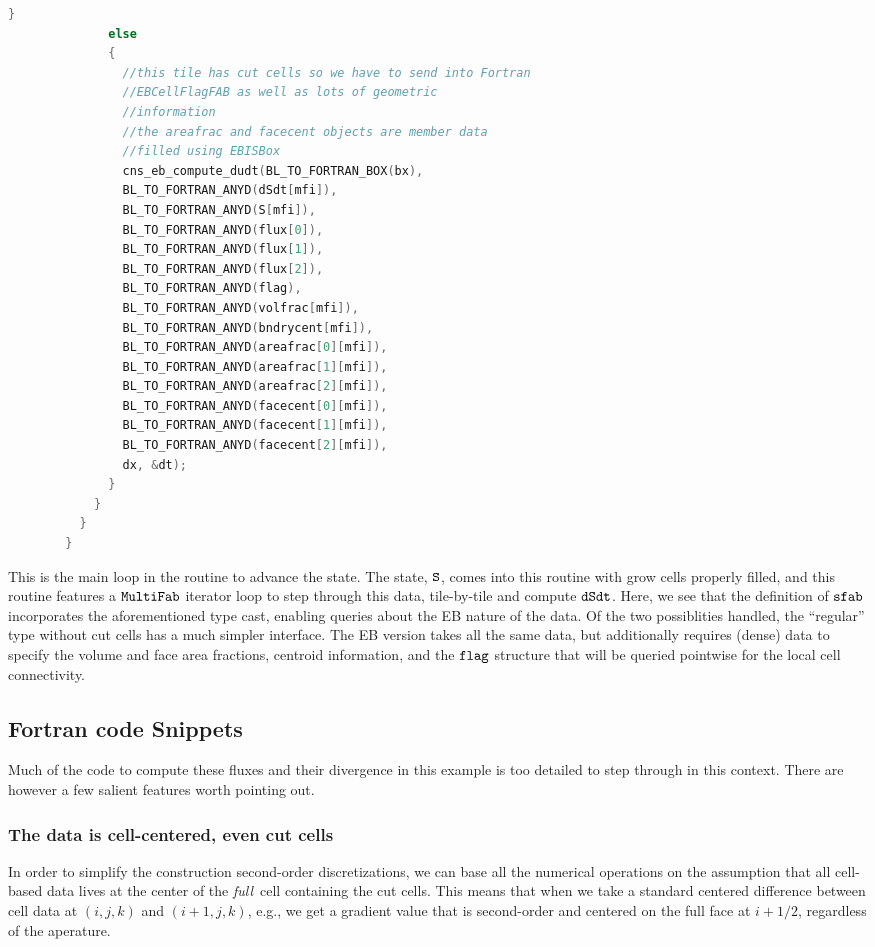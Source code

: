 \begin{lstlisting}[language=cpp]
              }
              else
              {
                //this tile has cut cells so we have to send into Fortran
                //EBCellFlagFAB as well as lots of geometric
                //information
                //the areafrac and facecent objects are member data
                //filled using EBISBox
                cns_eb_compute_dudt(BL_TO_FORTRAN_BOX(bx),
                BL_TO_FORTRAN_ANYD(dSdt[mfi]),
                BL_TO_FORTRAN_ANYD(S[mfi]),
                BL_TO_FORTRAN_ANYD(flux[0]),
                BL_TO_FORTRAN_ANYD(flux[1]),
                BL_TO_FORTRAN_ANYD(flux[2]),
                BL_TO_FORTRAN_ANYD(flag),
                BL_TO_FORTRAN_ANYD(volfrac[mfi]),
                BL_TO_FORTRAN_ANYD(bndrycent[mfi]),
                BL_TO_FORTRAN_ANYD(areafrac[0][mfi]),
                BL_TO_FORTRAN_ANYD(areafrac[1][mfi]),
                BL_TO_FORTRAN_ANYD(areafrac[2][mfi]),
                BL_TO_FORTRAN_ANYD(facecent[0][mfi]),
                BL_TO_FORTRAN_ANYD(facecent[1][mfi]),
                BL_TO_FORTRAN_ANYD(facecent[2][mfi]),
                dx, &dt);
              }
            }
          }
        }

\end{lstlisting}

This is the main loop in the routine to advance the state.  The state, $\tt{S}$, comes into this routine with grow cells
properly filled, and this routine features a $\tt{MultiFab}$ iterator loop to step through this data, tile-by-tile and compute
$\tt{dSdt}$.  Here, we see that the definition of $\tt{sfab}$ incorporates the aforementioned type cast, enabling queries about
the EB nature of the data.  Of the two possiblities handled, the ``regular'' type without cut cells has a much simpler interface.
The EB version takes all the same data, but additionally requires (dense) data to specify the volume and face area fractions,
centroid information, and the $\tt{flag}$ structure that will be queried pointwise for the local cell connectivity.

\subsection{Fortran code Snippets}
Much of the code to compute these fluxes and their divergence in this example is too detailed to step through in this context.
There are however a few salient features worth pointing out.

\subsubsection{The data is cell-centered, even cut cells}
In order to simplify the construction second-order discretizations, we can base all the numerical operations on the assumption
that all cell-based data lives at the center of the {\em full}\ cell containing the cut cells.  This means that when we take a
standard centered difference between cell data at $(i,j,k)$ and $(i+1,j,k)$, e.g., we get a gradient value that is second-order and
centered on the full face at $i+1/2$, regardless of the aperature.

